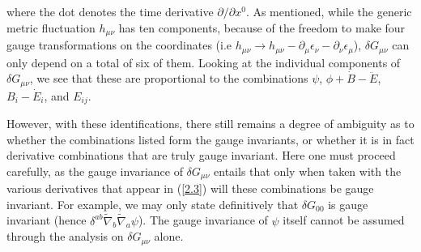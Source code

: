 %
where the dot denotes the time derivative $\partial/\partial x^0$. As mentioned, while the generic metric fluctuation $h_{\mu\nu}$ has ten components, because of the freedom to make four gauge transformations on the coordinates (i.e $h_{\mu\nu}\rightarrow h_{\mu\nu}-\partial_{\mu}\epsilon_{\nu}-\partial_{\nu}\epsilon_{\mu}$), $\delta G_{\mu\nu}$ can only depend on a total of six of them. Looking at the individual components of $\delta G_{\mu\nu}$, we see that these are proportional to the combinations $\psi$, $\phi+\dot{B}  -\ddot{E}$, $B_{i} -  \dot{E}_{i}$, and $E_{ij}$. 

However, with these identifications, there still remains a degree of ambiguity as to whether the combinations listed form the gauge invariants, or whether it is in fact derivative combinations that are truly gauge invariant. Here one must proceed carefully, as the gauge invariance of $\delta G_{\mu\nu}$ entails that only when taken with the various derivatives that appear in (\ref{2.3}) will these combinations be gauge invariant. For example, we may only state definitively that $\delta G_{00}$ is gauge invariant (hence $\delta^{ab} \tilde{\nabla}_{b}\tilde{\nabla}_{a}\psi$). The gauge invariance of $\psi$ itself cannot be assumed through the analysis on $\delta G_{\mu\nu}$ alone.


